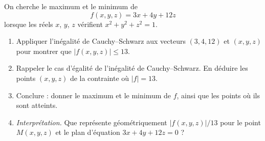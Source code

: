 On cherche le maximum et le minimum de
\[
f(x, y, z) = 3x + 4y + 12z
\]
lorsque les réels $x$, $y$, $z$ vérifient $x^2 + y^2 + z^2 = 1$.
\begin{enumerate}
  \item Appliquer l'inégalité de Cauchy--Schwarz aux vecteurs $(3, 4, 12)$ et
  $(x, y, z)$ pour montrer que $|f(x, y, z)| \leqslant 13$.
  \item Rappeler le cas d'égalité de l'inégalité de Cauchy--Schwarz. En
  déduire les points $(x, y, z)$ de la contrainte où $|f| = 13$.
  \item Conclure : donner le maximum et le minimum de $f$, ainsi que les
  points où ils sont atteints.
  \item \emph{Interprétation.} Que représente géométriquement $|f(x,y,z)|/13$
  pour le point $M(x, y, z)$ et le plan d'équation $3x + 4y + 12z = 0$ ?
\end{enumerate}
